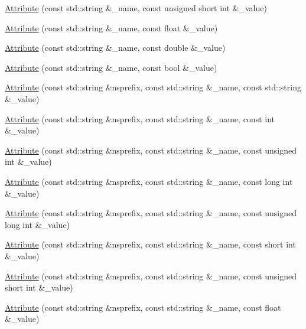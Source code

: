 \begin{DoxyCompactItemize}
\item 
\mbox{\hyperlink{classXMLWriterAPI_1_1Attribute_ac22bdee50ed54fb2c0b15a447196f14b}{Attribute}} (const std\+::string \&\+\_\+name, const unsigned short int \&\+\_\+value)
\item 
\mbox{\hyperlink{classXMLWriterAPI_1_1Attribute_ab48d99233b83dddd0c8713b65a738e61}{Attribute}} (const std\+::string \&\+\_\+name, const float \&\+\_\+value)
\item 
\mbox{\hyperlink{classXMLWriterAPI_1_1Attribute_a48165cf6ffa29bc718542fdc81b98764}{Attribute}} (const std\+::string \&\+\_\+name, const double \&\+\_\+value)
\item 
\mbox{\hyperlink{classXMLWriterAPI_1_1Attribute_ad16e250869a26c1058a73cd9faef5d2f}{Attribute}} (const std\+::string \&\+\_\+name, const bool \&\+\_\+value)
\item 
\mbox{\hyperlink{classXMLWriterAPI_1_1Attribute_af62de63beb69186f082ce7f612514115}{Attribute}} (const std\+::string \&nsprefix, const std\+::string \&\+\_\+name, const std\+::string \&\+\_\+value)
\item 
\mbox{\hyperlink{classXMLWriterAPI_1_1Attribute_a9e412b0bd0a009de13ec17416e18e5b0}{Attribute}} (const std\+::string \&nsprefix, const std\+::string \&\+\_\+name, const int \&\+\_\+value)
\item 
\mbox{\hyperlink{classXMLWriterAPI_1_1Attribute_ab3fa4bff9a545a9ae37ea8abde138769}{Attribute}} (const std\+::string \&nsprefix, const std\+::string \&\+\_\+name, const unsigned int \&\+\_\+value)
\item 
\mbox{\hyperlink{classXMLWriterAPI_1_1Attribute_a3a90c7d66504a0d26098167ab29078f4}{Attribute}} (const std\+::string \&nsprefix, const std\+::string \&\+\_\+name, const long int \&\+\_\+value)
\item 
\mbox{\hyperlink{classXMLWriterAPI_1_1Attribute_a49838f6100d4c88ddca013872cfe0a1d}{Attribute}} (const std\+::string \&nsprefix, const std\+::string \&\+\_\+name, const unsigned long int \&\+\_\+value)
\item 
\mbox{\hyperlink{classXMLWriterAPI_1_1Attribute_a302d83b35d8e0ad1d36e6e98455e54b7}{Attribute}} (const std\+::string \&nsprefix, const std\+::string \&\+\_\+name, const short int \&\+\_\+value)
\item 
\mbox{\hyperlink{classXMLWriterAPI_1_1Attribute_a632d5cb11f50e03bf79b27fb97b132a4}{Attribute}} (const std\+::string \&nsprefix, const std\+::string \&\+\_\+name, const unsigned short int \&\+\_\+value)
\item 
\mbox{\hyperlink{classXMLWriterAPI_1_1Attribute_a0640c93b661665cb3ed185178bd69119}{Attribute}} (const std\+::string \&nsprefix, const std\+::string \&\+\_\+name, const float \&\+\_\+value)

\end{DoxyCompactItemize}
